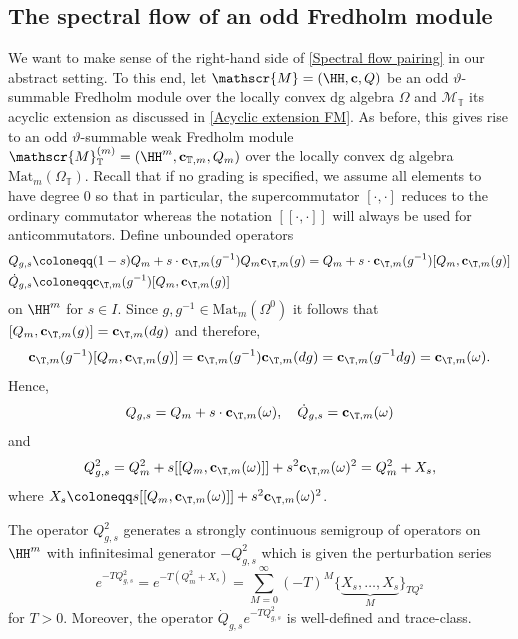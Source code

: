 \documentclass[a4paper, english, 12pt, bibliography=totocnumbered,
index=totoc]{scrartcl}
\begin{document}
\subsection{The spectral flow of an odd Fredholm module}\label{Section:
	spectral
	flow}
We want to make sense of the right-hand side of \cref{Spectral flow pairing}
in our abstract setting.
To this end, let $\mathscr{M} = (\HH, \mathbf{c}, Q)$ be an odd
$\vartheta$-summable Fredholm module over the locally convex dg algebra
$\Omega$ and $\mathscr{M}_{\mathbb{T}}$ its acyclic extension as discussed in
\cref{Acyclic extension FM}.
As before, this gives rise to an odd
$\vartheta$-summable weak Fredholm
module $\mathscr{M}_{\mathbb{T}}^{(m)} = (\HH^m, \mathbf{c}_{\mathbb{T}, m},
Q_m)$ over the locally convex dg algebra
$\mathrm{Mat}_m(\Omega_{\mathbb{T}})$.
Recall that if no grading is specified, we assume all elements to have
degree $0$ so that in particular, the supercommutator $[\cdot, \cdot]$
reduces to the ordinary
commutator whereas the notation $[[\cdot, \cdot]]$ will always be used for
anticommutators.
Define unbounded operators
\begin{align*}
	Q_{g,s} & \coloneqq (1-s)Q_m + s \cdot \mathbf{c}_{\T, m}(g^{-1}) Q_m
	\mathbf{c}_{\T, m}(g) = Q_m + s \cdot \mathbf{c}_{\T, m}(g^{-1})[Q_m,
	\mathbf{c}_{\T, m}(g)]\\
	\dot{Q}_{g,s} & \coloneqq \mathbf{c}_{\T, m}(g^{-1})[Q_m, \mathbf{c}_{\T,
		m}(g)]
\end{align*}
on $\HH^m$ for $s \in I$.
Since $g, g^{-1} \in \mathrm{Mat}_m(\Omega^0)$ it follows
that $[Q_m, \mathbf{c}_{\T, m}(g)] = \mathbf{c}_{\T, m}(d g)$ and therefore,
\begin{equation*}
	\mathbf{c}_{\T, m}(g^{-1})[Q_m, \mathbf{c}_{\T, m}(g)] = \mathbf{c}_{\T,
		m}(g^{-1}) \mathbf{c}_{\T, m}(dg) =
	\mathbf{c}_{\T, m}(g^{-1}dg) = \mathbf{c}_{\T, m}(\omega).
\end{equation*}
Hence,
\begin{equation*}
	Q_{g,s} = Q_m + s \cdot \mathbf{c}_{\T, m}(\omega), \quad \dot{Q}_{g,s} =
	\mathbf{c}_{\T, m}(\omega)
\end{equation*}
and
\begin{equation*}
	Q_{g,s}^2 = Q_m^2 + s[[Q_m, \mathbf{c}_{\T, m}(\omega)]] + s^2
	\mathbf{c}_{\T, m}(\omega)^2 = Q_m^2 + X_s,
\end{equation*}
where $X_s \coloneqq s[[Q_m, \mathbf{c}_{\T, m}(\omega)]] + s^2
\mathbf{c}_{\T, m}(\omega)^2$.
\begin{lem}
	The operator $Q_{g,s}^2$ generates a strongly continuous semigroup of
	operators on $\HH^m$ with infinitesimal generator $-Q_{g,s}^2$ which is
	given the perturbation series
	\begin{equation}\label{Perturbation series}
		e^{-TQ_{g,s}^2} = e^{-T(Q_m^2 + X_s)} = \sum_{M=0}^{\infty} (-T)^M
		\{\underbrace{X_s, \ldots, X_s}_M\}_{TQ^2}
	\end{equation}
	for $T > 0$.
	Moreover, the operator $\dot{Q}_{g,s} e^{-TQ_{g,s}^2}$ is well-defined
	and trace-class.
\end{lem}
\end{document}
